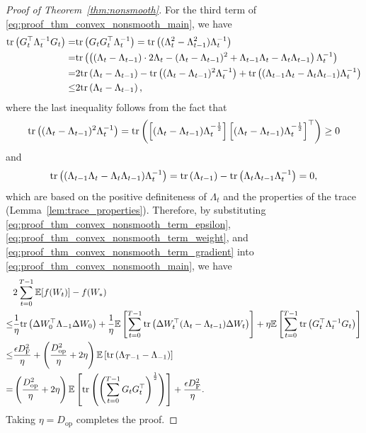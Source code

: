 \documentclass{article}
\theoremstyle{remark}
\newcommand{\tr}[1]{{\rm tr}\left( #1 \right)}
\newcommand{\EE}{\mathbb{E}}
\newcommand{\tW}{\Delta W}
\begin{document}
\begin{proof}[Proof of Theorem~\ref{thm:nonsmooth}]
For the third term of \eqref{eq:proof_thm_convex_nonsmooth_main}, we have
\begin{align}\label{eq:proof_thm_convex_nonsmooth_term_gradient}
\begin{split}
    \tr{G_t^\top \Lambda_t^{-1} G_t} =& \tr{G_t G_t^\top \Lambda_t^{-1} }
    = \tr{(\Lambda_t^2 - \Lambda_{t-1}^2) \Lambda_t^{-1} } \\
    =&
    \tr{\left( (\Lambda_t - \Lambda_{t-1}) \cdot 2 \Lambda_t - (\Lambda_t - \Lambda_{t-1})^2 + \Lambda_{t-1} \Lambda_t - \Lambda_t \Lambda_{t-1} \right) \Lambda_t^{-1}} \\
    =&
    2\tr{\Lambda_t - \Lambda_{t-1}} - \tr{(\Lambda_t - \Lambda_{t-1})^2 \Lambda_t^{-1}} + \tr{(\Lambda_{t-1} \Lambda_t - \Lambda_t \Lambda_{t-1}) \Lambda_t^{-1}} \\
    \le& 2\tr{\Lambda_t - \Lambda_{t-1}},
\end{split}
\end{align}
where the last inequality follows from the fact that
\begin{align*}
    \tr{(\Lambda_t - \Lambda_{t-1})^2 \Lambda_t^{-1}} = \tr{\left[ (\Lambda_t - \Lambda_{t-1}) \Lambda_t^{-\frac{1}{2}} \right] \left[ (\Lambda_t - \Lambda_{t-1}) \Lambda_t^{-\frac{1}{2}} \right]^\top} \ge 0
\end{align*}
and
\begin{align*}
    \tr{(\Lambda_{t-1} \Lambda_t - \Lambda_t \Lambda_{t-1}) \Lambda_t^{-1}} = \tr{\Lambda_{t-1} } - \tr{\Lambda_t \Lambda_{t-1} \Lambda_t^{-1}} = 0,
\end{align*}
which are based on the positive definiteness of $\Lambda_t$ and the properties of the trace (Lemma~\ref{lem:trace_properties}). Therefore, by substituting \eqref{eq:proof_thm_convex_nonsmooth_term_epsilon}, \eqref{eq:proof_thm_convex_nonsmooth_term_weight}, and \eqref{eq:proof_thm_convex_nonsmooth_term_gradient} into \eqref{eq:proof_thm_convex_nonsmooth_main}, we have
\begin{align*}
    &2\sum_{t=0}^{T-1} \EE[f(W_t)] -f(W_*) \\
    \le&
    \frac{1}{\eta} \tr{\tW_0^\top \Lambda_{-1} \tW_0} + \frac{1}{\eta} \EE\left[ \sum_{t=0}^{T-1} \tr{\tW_{t}^\top (\Lambda_t - \Lambda_{t-1}) \tW_{t} } \right] + \eta \EE\left[ \sum_{t=0}^{T-1} \tr{G_t^\top \Lambda_t^{-1} G_t} \right] \\
    \le&
    \frac{\epsilon D_{\mathrm{F}}^2}{\eta} + \left( \frac{D_{\mathrm{op}}^2}{\eta} + 2\eta \right) \EE\left[ \tr{\Lambda_{T-1} - \Lambda_{-1}} \right] \\
    =&
    \left( \frac{D_{\mathrm{op}}^2}{\eta} + 2\eta \right) \EE\left[ \tr{\left( \sum_{t=0}^{T-1} G_t G_t^\top \right)^{\frac{1}{2}}} \right] + \frac{\epsilon D_{\mathrm{F}}^2}{\eta} .
\end{align*}
Taking $\eta = D_{\mathrm{op}}$ completes the proof.
\end{proof}
\end{document}
